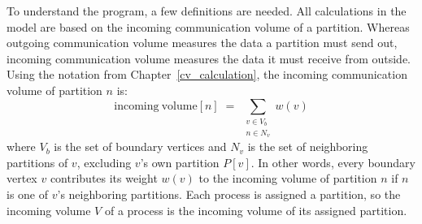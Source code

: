 To understand the program, a few definitions are needed. All calculations in the model are based on the incoming communication volume of a partition. Whereas outgoing communication volume measures the data a partition must send out, incoming communication volume measures the data it must receive from outside. Using the notation from Chapter~\ref{cv_calculation}, the incoming communication volume of partition $n$ is:
\begin{equation}\label{eq:incoming vol}
	\mathrm{incoming~volume}[n] \;=\; \sum_{\substack{v \in V_b \\ n \in N_v}} w(v)
\end{equation}
where $V_b$ is the set of boundary vertices and $N_v$ is the set of neighboring partitions of $v$, excluding $v$'s own partition $P[v]$. In other words, every boundary vertex $v$ contributes its weight $w(v)$ to the incoming volume of partition $n$ if $n$ is one of $v$'s neighboring partitions. Each process is assigned a partition, so the incoming volume $V$ of a process is the incoming volume of its assigned partition.

